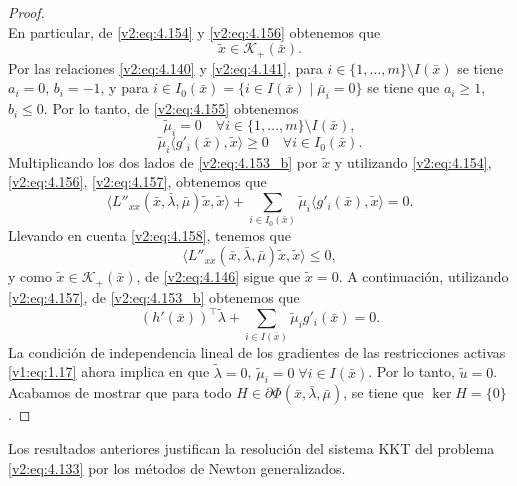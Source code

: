 \begin{proof}
\begin{equation}
        \label{v2:eq:4.156}
    \end{equation}
    En particular, de \eqref{v2:eq:4.154} y \eqref{v2:eq:4.156} obtenemos que
    \[
        \tilde{x} \in \mathcal{K}_+(\bar{x}).
    \]
    Por las relaciones \eqref{v2:eq:4.140} y \eqref{v2:eq:4.141}, para $i \in \{1, \dots, m\} \setminus I(\bar{x})$ se tiene $a_i = 0$, $b_i = -1$, y para $i \in I_0(\bar{x}) = \{i \in I(\bar{x}) \mid \bar{\mu}_i = 0\}$ se tiene que $a_i \ge 1$, $b_i \le 0$. Por lo tanto, de \eqref{v2:eq:4.155} obtenemos
    \begin{equation}
        \tilde{\mu}_i = 0 \quad \forall i \in \{1, \dots, m\} \setminus I(\bar{x}),
        \label{v2:eq:4.157}
    \end{equation}
    \begin{equation}
        \tilde{\mu}_i \langle g'_i(\bar{x}), \tilde{x} \rangle \ge 0 \quad \forall i \in I_0(\bar{x}).
        \label{v2:eq:4.158}
    \end{equation}
    Multiplicando los dos lados de \eqref{v2:eq:4.153_b} por $\tilde{x}$ y utilizando \eqref{v2:eq:4.154}, \eqref{v2:eq:4.156}, \eqref{v2:eq:4.157}, obtenemos que
    \[
        \langle L''_{xx}(\bar{x}, \bar{\lambda}, \bar{\mu})\tilde{x}, \tilde{x} \rangle + \sum_{i \in I_0(\bar{x})} \tilde{\mu}_i \langle g'_i(\bar{x}), \tilde{x} \rangle = 0.
    \]
    Llevando en cuenta \eqref{v2:eq:4.158}, tenemos que
    \[
        \langle L''_{xx}(\bar{x}, \bar{\lambda}, \bar{\mu})\tilde{x}, \tilde{x} \rangle \le 0,
    \]
    y como $\tilde{x} \in \mathcal{K}_+(\bar{x})$, de \eqref{v2:eq:4.146} sigue que $\tilde{x} = 0$.
    A continuación, utilizando \eqref{v2:eq:4.157}, de \eqref{v2:eq:4.153_b} obtenemos que
    \[
        (h'(\bar{x}))^\top\tilde{\lambda} + \sum_{i \in I(\bar{x})} \tilde{\mu}_i g'_i(\bar{x}) = 0.
    \]
    La condición de independencia lineal de los gradientes de las restricciones activas \eqref{v1:eq:1.17} ahora implica en que $\tilde{\lambda} = 0$, $\tilde{\mu}_i = 0 \; \forall i \in I(\bar{x})$. Por lo tanto, $\tilde{u} = 0$.
    Acabamos de mostrar que para todo $H \in \partial \Phi(\bar{x}, \bar{\lambda}, \bar{\mu})$, se tiene que $\ker H = \{0\}$.
\end{proof}

Los resultados anteriores justifican la resolución del sistema KKT del problema \eqref{v2:eq:4.133} por los métodos de Newton generalizados.

